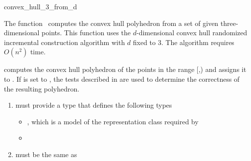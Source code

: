 

\begin{ccRefFunction}{convex_hull_3_from_d}  

\ccDefinition
  
The function \ccRefName\ computes the convex hull polyhedron from a set
of given three-dimensional points.  This function uses the $d$-dimensional
convex hull randomized incremental construction algorithm 
\cite{cms:fourresults-93}
with $d$ fixed to 3.  The algorithm requires $O(n^2)$ time.


            {computes the convex hull polyhedron 
            of the points in the range [,)
            and assigns it to .  If  is set to
            , the tests described in \cite{mnssssu-cgpvg-96} are
            used to determine the correctness of the resulting polyhedron.
            }

\begin{enumerate}
   \item    {} must provide a type 
            that defines the following types
             \begin{itemize}
               \item {}, which is a model of 
                     the representation class  required by
               \item {}
             \end{itemize}
   \item    {} must be the same as
\end{enumerate}


\end{ccRefFunction}
